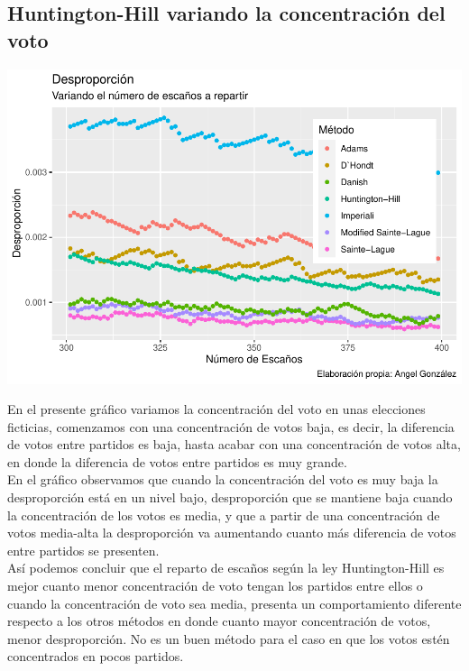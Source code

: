 \documentclass[12pt,a4paper,]{book}
\numberwithin{dummy}{section}
\theoremstyle{ocrenumbox}
\theoremstyle{blacknumex}
\theoremstyle{blacknumbox}
\theoremstyle{ocrenum}
\theoremstyle{ocrenum}
\begin{document}
\hypertarget{huntington-hill-variando-la-concentraciuxf3n-del-voto}{%
\subsection{Huntington-Hill variando la concentración del
voto}\label{huntington-hill-variando-la-concentraciuxf3n-del-voto}}

\begin{center}\includegraphics[width=0.95\linewidth]{figurasR/unnamed-chunk-40-1} \end{center}

En el presente gráfico variamos la concentración del voto en unas
elecciones ficticias, comenzamos con una concentración de votos baja, es
decir, la diferencia de votos entre partidos es baja, hasta acabar con
una concentración de votos alta, en donde la diferencia de votos entre
partidos es muy grande.\\
En el gráfico observamos que cuando la concentración del voto es muy
baja la desproporción está en un nivel bajo, desproporción que se
mantiene baja cuando la concentración de los votos es media, y que a
partir de una concentración de votos media-alta la desproporción va
aumentando cuanto más diferencia de votos entre partidos se presenten.\\
Así podemos concluir que el reparto de escaños según la ley
Huntington-Hill es mejor cuanto menor concentración de voto tengan los
partidos entre ellos o cuando la concentración de voto sea media,
presenta un comportamiento diferente respecto a los otros métodos en
donde cuanto mayor concentración de votos, menor desproporción. No es un
buen método para el caso en que los votos estén concentrados en pocos
partidos.
\end{document}
